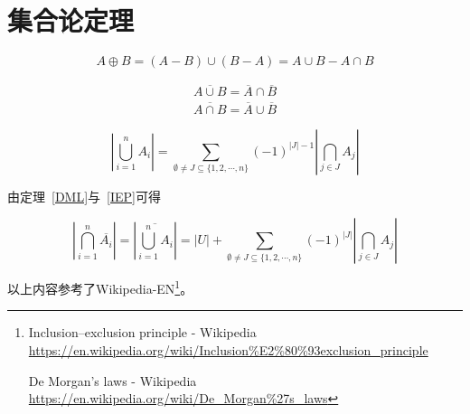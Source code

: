 \section{集合论定理}
\begin{theorem}[对称差]
	\begin{displaymath}
		A\oplus B=(A-B)\cup(B-A)=A\cup B - A\cap B
	\end{displaymath}
\end{theorem}
\begin{theorem}\label{DML}
	\begin{eqnarray*}
		\overline{A\cup B}=\overline{A}\cap \overline{B} \\
		\overline{A\cap B}=\overline{A}\cup \overline{B}
	\end{eqnarray*}
\end{theorem}
\begin{theorem}\label{IEP}
	\begin{displaymath}
		\left|\bigcup_{i=1}^n{A_i}\right|=
		\sum_{\emptyset \neq J\subseteq \{1,2,\cdots,n\}}{(-1)^{|J|-1}
			\left|\bigcap_{j\in J}{A_j}\right|}
	\end{displaymath}
\end{theorem}

由定理~\ref{DML}与~\ref{IEP}可得

\begin{theorem}\label{ExDML}
	\begin{displaymath}
		\left|\bigcap_{i=1}^n\overline{A_i}\right|=
		\left|\overline{\bigcup_{i=1}^n{A_i}}\right|=
		|U|+\sum_{\emptyset \neq J\subseteq \{1,2,\cdots,n\}}{(-1)^{|J|}
			\left|\bigcap_{j\in J}{A_j}\right|}
	\end{displaymath}
\end{theorem}

以上内容参考了Wikipedia-EN\footnote{Inclusion–exclusion principle - Wikipedia
	\url{https://en.wikipedia.org/wiki/Inclusion\%E2\%80\%93exclusion\_principle}

	De Morgan's laws - Wikipedia
    \url{https://en.wikipedia.org/wiki/De\_Morgan\%27s\_laws}}。
